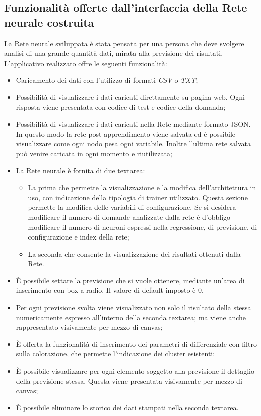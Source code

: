 \subsection{Funzionalit\`a offerte dall'interfaccia della Rete neurale costruita}
\label{Funzionalita offerte dall'interfaccia della Rete neurale}
La Rete neurale sviluppata \`e stata pensata per una persona che deve svolgere analisi di una grande quantit\`a dati, mirata alla previsione dei risultati. L'applicativo realizzato offre le seguenti funzionalit\`a:
\begin{itemize}
\item Caricamento dei dati con l'utilizzo di formati \textit{CSV} o \textit{TXT};
\item Possibilit\`a di visualizzare i dati caricati direttamente su pagina web. Ogni risposta viene presentata con codice di test e codice della domanda;
\item Possibilit\`a di visualizzare i dati caricati nella Rete mediante formato JSON. In questo modo la rete post apprendimento viene salvata ed \`e possibile visualizzare come ogni nodo pesa ogni variabile. Inoltre l'ultima rete salvata pu\`o venire caricata in ogni momento e riutilizzata;
\item La Rete neurale \`e fornita di due textarea: 
\begin{itemize}
\item La prima che permette la visualizzazione e la modifica dell'architettura in uso, con indicazione della tipologia di trainer utilizzato. Questa sezione permette la modifica delle variabili di configurazione. Se si desidera modificare il numero di domande analizzate dalla rete \`e d'obbligo modificare il numero di neuroni espressi nella regressione, di previsione, di configurazione e index della rete;
\item La seconda che consente la visualizzazione dei risultati ottenuti dalla Rete.
\end{itemize}
\item \`E possibile settare la previsione che si vuole ottenere, mediante un'area di inserimento con box a radio. Il valore di default imposto \`e 0. 
\item Per ogni previsione svolta viene visualizzato non solo il risultato della stessa numericamente espresso all'interno della seconda textarea; ma viene anche rappresentato visivamente per mezzo di canvas;
\item \`E offerta la funzionalit\`a di inserimento dei parametri di differenziale con filtro sulla colorazione, che permette l'indicazione dei cluster esistenti;
\item \`E possibile visualizzare per ogni elemento soggetto alla previsione il dettaglio della previsione stessa. Questa viene presentata visivamente per mezzo di canvas;
\item \`E possibile eliminare lo storico dei dati stampati nella seconda textarea.
\end{itemize}


